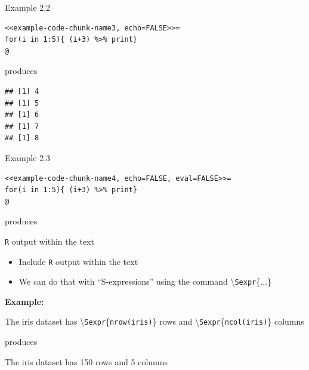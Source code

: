 \documentclass[10pt]{beamer}\usepackage[]{graphicx}\usepackage[]{color}
\makeatletter
\newenvironment{kframe}{%
 \def\at@end@of@kframe{}%
 \ifinner\ifhmode%
  \def\at@end@of@kframe{\end{minipage}}%
  \begin{minipage}{\columnwidth}%
 \fi\fi%
 \def\FrameCommand##1{\hskip\@totalleftmargin \hskip-\fboxsep
 \colorbox{shadecolor}{##1}\hskip-\fboxsep
     \hskip-\linewidth \hskip-\@totalleftmargin \hskip\columnwidth}%
 \MakeFramed {\advance\hsize-\width
   \@totalleftmargin\z@ \linewidth\hsize
   \@setminipage}}%
 {\par\unskip\endMakeFramed%
 \at@end@of@kframe}
\newenvironment{knitrout}{}{} %
\makeatother
\begin{document}
\begin{frame}[fragile]{Example 2.2}
\begin{knitrout}
\color{fgcolor}\begin{kframe}
\begin{verbatim}
<<example-code-chunk-name3, echo=FALSE>>=
for(i in 1:5){ (i+3) %>% print}
@
\end{verbatim}
\end{kframe}
\end{knitrout}
produces
\begin{knitrout}
\color{fgcolor}\begin{kframe}
\begin{verbatim}
## [1] 4
## [1] 5
## [1] 6
## [1] 7
## [1] 8
\end{verbatim}
\end{kframe}
\end{knitrout}

\end{frame}


\begin{frame}[fragile]{Example 2.3}
\begin{knitrout}
\color{fgcolor}\begin{kframe}
\begin{verbatim}
<<example-code-chunk-name4, echo=FALSE, eval=FALSE>>=
for(i in 1:5){ (i+3) %>% print}
@
\end{verbatim}
\end{kframe}
\end{knitrout}
produces


\end{frame}



\begin{frame}[fragile]{\texttt{R} output within the text}
\begin{itemize}
\item Include \texttt{R} output within the text
\item We can do that with ``S-expressions'' using the command \textbackslash \texttt{Sexpr}\{$\ldots$\}
\end{itemize}
\vspace{1cm}

\textbf{Example:} \vspace{0.3cm}

The iris dataset has \textbackslash \texttt{Sexpr}\{\texttt{nrow(iris)}\} rows and \textbackslash \texttt{Sexpr}\{\texttt{ncol(iris)}\} columns
\vspace{0.5cm}

produces \vspace{0.5cm}

The iris dataset has 150 rows and 5 columns


\end{frame}
\end{document}

